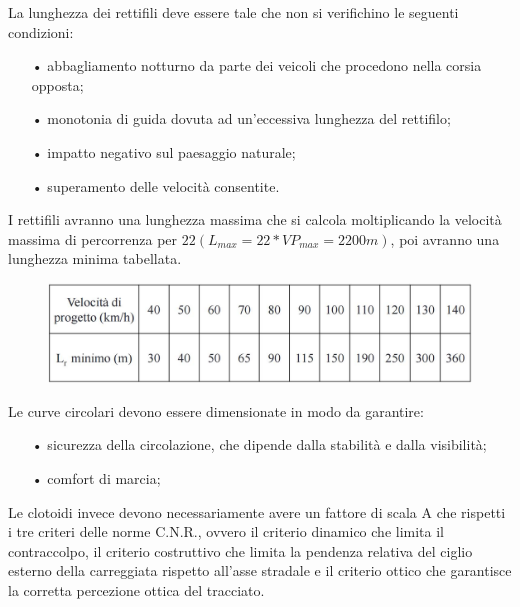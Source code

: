 La lunghezza dei rettifili deve essere tale che non si verifichino le seguenti condizioni:

\begin{itemize}
	\item[•] abbagliamento notturno da parte dei veicoli che procedono nella corsia opposta;
	\item[•] monotonia di guida dovuta ad un’eccessiva lunghezza del rettifilo;
	\item[•] impatto negativo sul paesaggio naturale;
	\item[•] superamento delle velocità consentite.
\end{itemize}

I rettifili avranno una lunghezza massima che si calcola moltiplicando la velocità massima di percorrenza per $22 (L_{max}=22*VP_{max}= 2200m)$, poi avranno una lunghezza minima tabellata.

\begin{figure}[H]
	\centering
	\includegraphics[width=\linewidth]{Figures/Lunghezze rettifilo minime}
    \label{fig:Lunghezze rettifilo minime}
\end{figure}

Le curve circolari devono essere dimensionate in modo da garantire:

\begin{itemize}
	\item[•] sicurezza della circolazione, che dipende dalla stabilità e dalla visibilità;
	\item[•] comfort di marcia;
\end{itemize}

Le clotoidi invece devono necessariamente avere un fattore di scala A che rispetti i tre criteri delle norme C.N.R., ovvero il criterio dinamico che limita il contraccolpo, il criterio costruttivo che limita la pendenza relativa del ciglio esterno della carreggiata rispetto all’asse stradale e il criterio ottico che garantisce la corretta percezione ottica del tracciato.

